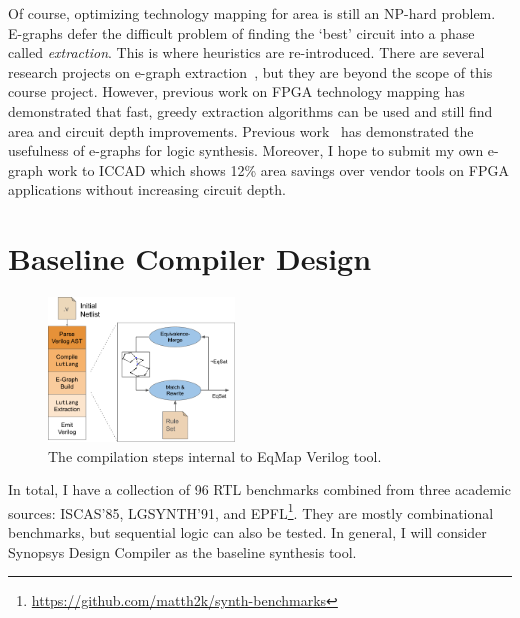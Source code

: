 \documentclass[10pt,letterpaper]{article}
\newcommand{\shortname}{EqMap}
\begin{document}
Of course, optimizing technology mapping for area is still an NP-hard problem.
E-graphs defer the difficult problem of finding the `best' circuit into a phase
called \textit{extraction}. This is where heuristics are re-introduced. There
are several research projects on e-graph
extraction~\cite{smoothe,sparsextract}, but they are beyond the scope of this
course project. However, previous work on FPGA technology mapping has
demonstrated that fast, greedy extraction algorithms can be used and still find
area and circuit depth improvements. Previous work~\cite{esyn} has demonstrated
the usefulness of e-graphs for logic synthesis. Moreover, I hope to submit my
own e-graph work to ICCAD which shows 12\% area savings over vendor tools on
FPGA applications without increasing circuit depth.

\pagebreak
\section{Baseline Compiler Design}\label{sec:baseline}

\begin{figure}
    \centering
    \includegraphics[width=0.44\textwidth]{img/egraph.pdf}
    \caption{The compilation steps internal to \shortname{} Verilog tool.}\label{fig:flow:egraph}
\end{figure}

In total, I have a collection of 96 RTL benchmarks combined from three academic
sources: ISCAS'85, LGSYNTH'91, and
EPFL\footnote{\href{https://github.com/matth2k/synth-benchmarks}{https://github.com/matth2k/synth-benchmarks}}.
They are mostly combinational benchmarks, but sequential logic can also be
tested. In general, I will consider Synopsys Design Compiler as the baseline
synthesis tool.
\end{document}
